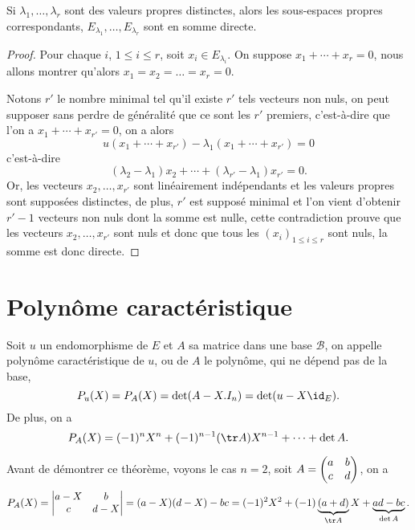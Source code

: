 \documentclass[class=report,crop=false]{standalone}
\begin{document}
\begin{corollaire}
Si $\lambda_1,\dots,\lambda_r$ sont des valeurs propres distinctes, 
alors les sous-espaces propres correspondants, 
$E_{\lambda_1},\dots,E_{\lambda_r}$ sont en somme directe.
\end{corollaire} 

\begin{proof}
Pour chaque $i$, $1\leq i\leq r$, soit $x_i \in E_{\lambda_i}$. On suppose $x_1+\cdots+x_r=0$, nous allons montrer
qu'alors $x_1=x_2=\dots=x_r=0$.

Notons $r'$ le nombre minimal tel qu'il existe $r'$ tels vecteurs non nuls, on peut supposer sans perdre de généralité que ce sont les $r'$ premiers, c'est-à-dire que l'on a 
$x_1+\cdots+x_{r'}=0$, on a alors
$$u(x_1+\cdots+x_{r'})-\lambda_1(x_1+\cdots+x_{r'})=0$$
c'est-à-dire
$$(\lambda_2-\lambda_1)x_2+\cdots+(\lambda_{r'}-\lambda_1)x_{r'}=0.$$
Or, les vecteurs $x_2,\dots,x_{r'}$ sont linéairement indépendants et les valeurs propres sont supposées distinctes, de plus, $r'$ est supposé minimal et l'on vient d'obtenir $r'-1$ vecteurs non nuls dont la somme est nulle, cette contradiction prouve que les vecteurs $x_2,\dots,x_{r'}$ sont nuls 
et donc que tous les $(x_i)_{1\leq i\leq r}$ sont nuls, la somme est donc directe.
\end{proof}



\section{Polynôme caractéristique}

\begin{proposition}
Soit $u$ un endomorphisme de $E$ et $A$ sa matrice dans une base $\mathcal{B}$, on appelle
polynôme caractéristique de $u$, ou de $A$ le polynôme, qui ne dépend pas de la base, 
$$P_u(X)=P_A(X)=\det(A-X.I_n)=\det(u-X\id_E).$$
De plus, on a 
$$P_A(X)=(-1)^nX^n + (-1)^{n-1}(\tr A)X^{n-1}+\dots+\det A.$$
\end{proposition} 

Avant de démontrer ce théorème, voyons le cas $n=2$, 
soit $A=\left(\begin{matrix}a&b\cr c&d\end{matrix}\right)$, 
on a $$P_A(X)=\left|\begin{matrix}a-X&b\cr c& d-X\end{matrix}\right|
=(a-X)(d-X)-bc=(-1)^2X^2+(-1)\underbrace{(a+d)}_{\tr A}X+
\underbrace{ad-bc}_{\det A}.$$
\end{document}
